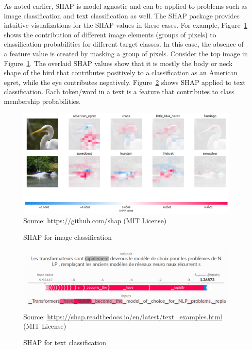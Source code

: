 As noted earlier, SHAP is model agnostic and can be applied to problems such as image classification and text classification as well. The SHAP package provides intuitive visualizations for the SHAP values in these cases. For example, Figure~\ref{fig:shapimage} shows the contribution of different image elements (groups of pixels) to classification probabilities for different target classes. In this case, the absence of a feature value is created by masking a group of pixels. Consider the top image in Figure~\ref{fig:shapimage}. The overlaid SHAP values show that it is mostly the body or neck shape of the bird that contributes positively to a classification as an American egret, while the eye contributes negatively. Figure~\ref{fig:shaptext} shows SHAP applied to text classification. Each token/word in a text is a feature that contributes to class membership probabilities.  

\begin{figure}
\centering

\includegraphics[width=.75\textwidth]{shap_image.png} \\

\scriptsize Source: \url{https://github.com/shap} (MIT License)
\caption{SHAP for image classification}
\label{fig:shapimage}
\end{figure}

\begin{figure}
\centering

\includegraphics[width=.75\textwidth]{shap_text.png} \\

\scriptsize Source: \url{https://shap.readthedocs.io/en/latest/text_examples.html} (MIT License)
\caption{SHAP for text classification}
\label{fig:shaptext}
\end{figure}

